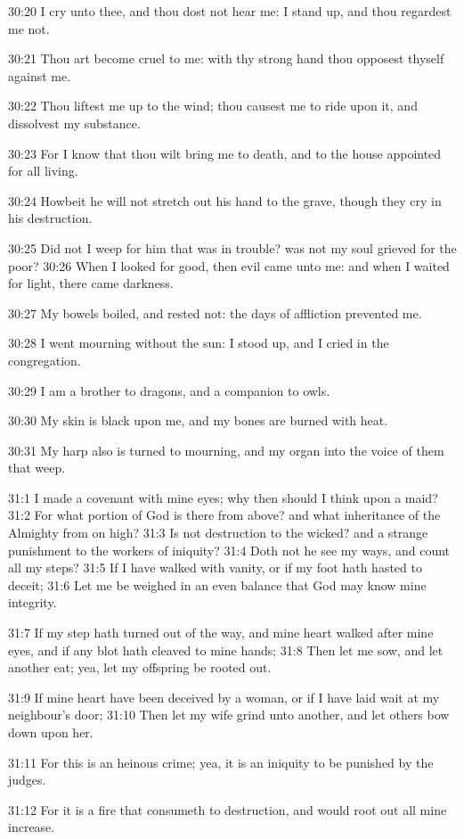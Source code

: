 30:20 I cry unto thee, and thou dost not hear me: I stand up, and thou regardest me not.

30:21 Thou art become cruel to me: with thy strong hand thou opposest thyself against me.

30:22 Thou liftest me up to the wind; thou causest me to ride upon it, and dissolvest my substance.

30:23 For I know that thou wilt bring me to death, and to the house appointed for all living.

30:24 Howbeit he will not stretch out his hand to the grave, though they cry in his destruction.

30:25 Did not I weep for him that was in trouble? was not my soul grieved for the poor?  30:26 When I looked for good, then evil came unto me: and when I waited for light, there came darkness.

30:27 My bowels boiled, and rested not: the days of affliction prevented me.

30:28 I went mourning without the sun: I stood up, and I cried in the congregation.

30:29 I am a brother to dragons, and a companion to owls.

30:30 My skin is black upon me, and my bones are burned with heat.

30:31 My harp also is turned to mourning, and my organ into the voice of them that weep.

31:1 I made a covenant with mine eyes; why then should I think upon a maid?  31:2 For what portion of God is there from above? and what inheritance of the Almighty from on high?  31:3 Is not destruction to the wicked? and a strange punishment to the workers of iniquity?  31:4 Doth not he see my ways, and count all my steps?  31:5 If I have walked with vanity, or if my foot hath hasted to deceit; 31:6 Let me be weighed in an even balance that God may know mine integrity.

31:7 If my step hath turned out of the way, and mine heart walked after mine eyes, and if any blot hath cleaved to mine hands; 31:8 Then let me sow, and let another eat; yea, let my offspring be rooted out.

31:9 If mine heart have been deceived by a woman, or if I have laid wait at my neighbour's door; 31:10 Then let my wife grind unto another, and let others bow down upon her.

31:11 For this is an heinous crime; yea, it is an iniquity to be punished by the judges.

31:12 For it is a fire that consumeth to destruction, and would root out all mine increase.

